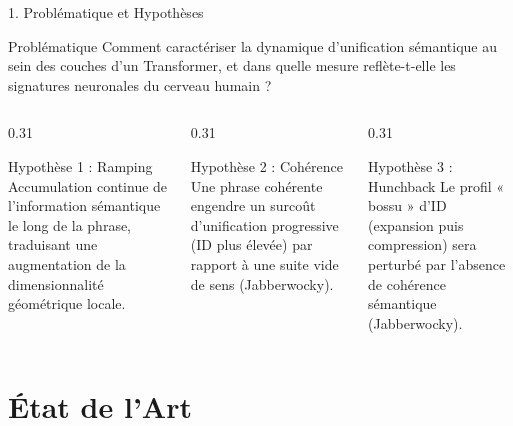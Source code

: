 \documentclass[t, aspectratio=169]{beamer}
\begin{document}
\begin{frame}{1. Problématique et Hypothèses}
  \begin{block}{Problématique}
    \centering\large\color{utred}
    Comment caractériser la dynamique d'unification sémantique au sein des couches d'un Transformer, et dans quelle mesure reflète-t-elle les signatures neuronales du cerveau humain ?
  \end{block}
  \vspace{0.2cm}
  \begin{columns}[t]
    \begin{column}{0.31\textwidth}
      \begin{block}{Hypothèse 1 : Ramping}
        \scriptsize
        Accumulation continue de l'information sémantique le long de la phrase, traduisant une augmentation de la dimensionnalité géométrique locale.
      \end{block}
    \end{column}
    
    \begin{column}{0.31\textwidth}
      \begin{block}{Hypothèse 2 : Cohérence}
        \scriptsize
        Une phrase cohérente engendre un surcoût d'unification progressive (ID plus élevée) par rapport à une suite vide de sens (Jabberwocky).
      \end{block}
    \end{column}
    
    \begin{column}{0.31\textwidth}
      \begin{block}{Hypothèse 3 : Hunchback}
        \scriptsize
        Le profil « bossu » d'ID (expansion puis compression) sera perturbé par l'absence de cohérence sémantique (Jabberwocky).
      \end{block}
    \end{column}
  \end{columns}
\end{frame}

\section{État de l'Art}
\end{document}
